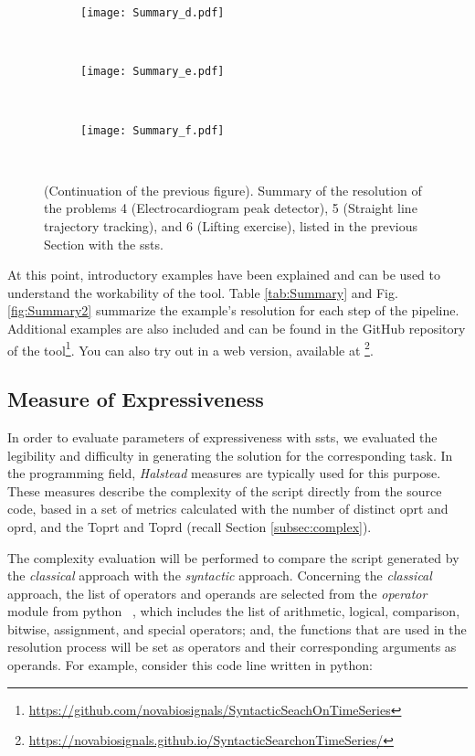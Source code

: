 \begin{figure}
	\ContinuedFloat
    \begin{subfigure}{\textwidth}
    \texttt{[image: Summary\_d.pdf]}
    \caption{}
    \end{subfigure}\\	

    \begin{subfigure}{\textwidth}
    \texttt{[image: Summary\_e.pdf]}
    \caption{}
    \end{subfigure}	\\
    \begin{subfigure}{\textwidth}
    \texttt{[image: Summary\_f.pdf]}
    \caption{}
    \end{subfigure}\\
    \caption{(Continuation of the previous figure). Summary of the resolution of the problems 4 (Electrocardiogram peak detector), 5 (Straight line trajectory tracking), and 6 (Lifting exercise), listed in the previous Section with the \gls{ssts}.}
\end{figure}

At this point, introductory examples have been explained and can be used to understand the workability of the tool. Table \ref{tab:Summary} and Fig. \ref{fig:Summary2} summarize the example's resolution for each step of the pipeline. Additional examples are also included and can be found in the GitHub repository of the tool\footnote{\url{https://github.com/novabiosignals/SyntacticSeachOnTimeSeries}}. You can also try out in a web version, available at \footnote{\url{https://novabiosignals.github.io/SyntacticSearchonTimeSeries/}}.


\subsection{Measure of Expressiveness}

In order to evaluate parameters of expressiveness with \gls{ssts}, we evaluated the legibility and difficulty in generating the solution for the corresponding task. In the programming field, \textit{Halstead} measures are typically used for this purpose. These measures describe the complexity of the script directly from the source code, based in a set of metrics calculated with the number of distinct \gls{oprt} and \gls{oprd}, and the \gls{Toprt} and \gls{Toprd} (recall Section \ref{subsec:complex}).
\par
The complexity evaluation will be performed to compare the script generated by the \textit{classical} approach with the \textit{syntactic} approach. Concerning the \textit{classical} approach, the list of operators and operands are selected from the \textit{operator} module from python ~\cite{oprtPy}, which includes the list of arithmetic, logical, comparison, bitwise, assignment, and special operators; and, the functions that are used in the resolution process will be set as operators and their corresponding arguments as operands. For example, consider this code line written in python:

